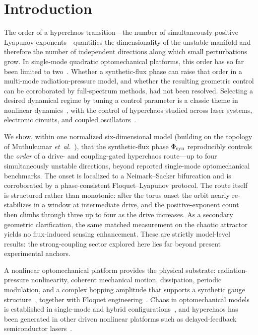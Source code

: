 \documentclass[preprint,numbers,a4paper]{elsarticle}
\begin{document}
\section{Introduction}

The order of a hyperchaos transition---the number of simultaneously positive Lyapunov exponents---quantifies the dimensionality of the unstable manifold and therefore the number of independent directions along which small perturbations grow. In single-mode quadratic optomechanical platforms, this order has so far been limited to two~\cite{HalefShomroni2025}. Whether a synthetic-flux phase can raise that order in a multi-mode radiation-pressure model, and whether the resulting geometric control can be corroborated by full-spectrum methods, had not been resolved. Selecting a desired dynamical regime by tuning a control parameter is a classic theme in nonlinear dynamics~\cite{ott1990,boccaletti2000}, with the control of hyperchaos studied across laser systems, electronic circuits, and coupled oscillators~\cite{rafikov2008,vicente2005}.

We show, within one normalized six-dimensional model (building on the topology of Muthukumar \emph{et~al.}~\cite{muthukumar2025doi}), that the synthetic-flux phase $\Phi_{\rm syn}$ reproducibly controls the \emph{order} of a drive- and coupling-gated hyperchaos route---up to four simultaneously unstable directions, beyond reported single-mode optomechanical benchmarks. The onset is localized to a Neimark--Sacker bifurcation and is corroborated by a phase-consistent Floquet--Lyapunov protocol. The route itself is structured rather than monotonic: after the torus onset the orbit nearly re-stabilizes in a window at intermediate drive, and the positive-exponent count then climbs through three up to four as the drive increases. As a secondary geometric clarification, the same matched measurement on the chaotic attractor yields no flux-induced sensing enhancement. These are strictly model-level results: the strong-coupling sector explored here lies far beyond present experimental anchors.

A nonlinear optomechanical platform provides the physical substrate: radiation-pressure nonlinearity, coherent mechanical motion, dissipation, periodic modulation, and a complex hopping amplitude that supports a synthetic gauge structure~\cite{aspelmeyer2014,kippenberg2008,marquardt2006,carmon2007,alphonse2022}, together with Floquet engineering~\cite{oka2009,goldman2014,bukov2015,kitagawa2010,peano2015,sanavio2020}. Chaos in optomechanical models is established in single-mode and hybrid configurations~\cite{larson2011,wang2016,chen2024}, and hyperchaos has been generated in other driven nonlinear platforms such as delayed-feedback semiconductor lasers~\cite{vicente2005}.
\end{document}
